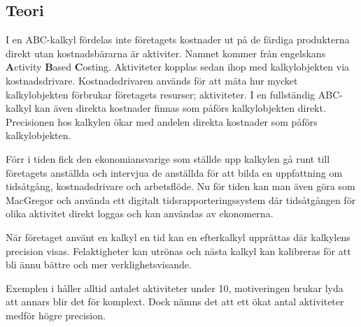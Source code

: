 \subsection{Teori} %


I en ABC-kalkyl fördelas inte företagets kostnader ut på de färdiga produkterna direkt utan kostnadsbärarna är aktiviter.
Namnet kommer från engelskans {\bf A}ctivity {\bf B}ased {\bf C}osting.
Aktiviteter kopplas sedan ihop med kalkylobjekten via kostnadsdrivare.
Kostnadsdrivaren används för att mäta hur mycket kalkylobjekten förbrukar företagets resurser; aktiviteter.
I en fullständig ABC-kalkyl kan även direkta kostnader finnas som påförs kalkylobjekten direkt.
Precisionen hos kalkylen ökar med andelen direkta kostnader som påförs kalkylobjekten.\cite{dne}

Förr i tiden fick den ekonomiansvarige som ställde upp kalkylen gå runt till företagets anställda och intervjua de anställda för att bilda en uppfattning om tidsåtgång, kostnadsdrivare och arbetsflöde.
Nu för tiden kan man även göra som MacGregor och använda ett digitalt tidsrapporteringssystem där tidsåtgången för olika aktivitet direkt loggas och kan användas av ekonomerna\cite{daniel}.

När företaget använt en kalkyl en tid kan en efterkalkyl upprättas där kalkylens precision visas. Felaktigheter kan utrönas och nästa kalkyl kan kalibreras för att bli ännu bättre och mer verklighetsvisande.


Exemplen i \cite{dne} håller alltid antalet aktiviteter under 10, motiveringen brukar lyda att annars blir det för komplext.
Dock nämns det att ett ökat antal aktiviteter medför högre precision.